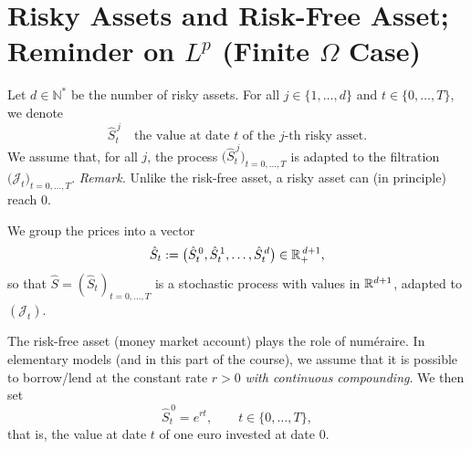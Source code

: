 \section{Risky Assets and Risk-Free Asset; Reminder on $L^p$ (Finite $\Omega$ Case)}

\begin{definition}
Let $d\in\mathbb{N}^*$ be the number of risky assets. For all $j\in\{1,\dots,d\}$ and
$t\in\{0,\dots,T\}$, we denote
\begin{equation}
\hat S_t^{\,j}\quad\text{the value at date }t\text{ of the $j$-th risky asset.}
\end{equation}
We assume that, for all $j$, the process $\big(\hat S_t^{\,j}\big)_{t=0,\dots,T}$ is adapted to the
filtration $\big(\mathcal{J}_t\big)_{t=0,\dots,T}$. \emph{Remark.} Unlike the risk-free asset,
a risky asset can (in principle) reach $0$.
\end{definition}

\begin{definition}
We group the prices into a vector
\begin{equation}
\hat S_t:=\big(\hat S_t^{\,0},\hat S_t^{\,1},\dots,\hat S_t^{\,d}\big)\in\mathbb{R}_+^{\,d+1},
\end{equation}
so that $\hat S=(\hat S_t)_{t=0,\dots,T}$ is a stochastic process with values in $\mathbb{R}^{d+1}$, adapted to
$(\mathcal{J}_t)$.
\end{definition}

\begin{definition}
The risk-free asset (money market account) plays the role of numéraire. In elementary models
(and in this part of the course), we assume that it is possible to borrow/lend at the
constant rate $r>0$ \emph{with continuous compounding}. We then set
\begin{equation}
\hat S_t^{\,0}=e^{rt},\qquad t\in\{0,\dots,T\},
\end{equation}
that is, the value at date $t$ of one euro invested at date $0$.
\end{definition}

\bigskip
